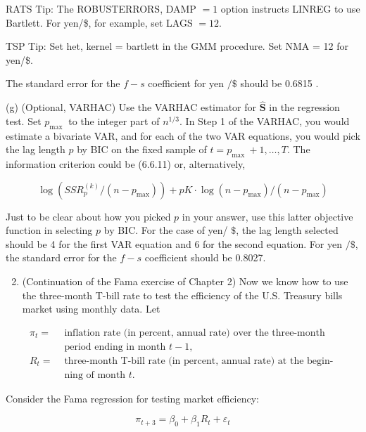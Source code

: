 \documentclass[10pt]{article}
\begin{document}
RATS Tip: The ROBUSTERRORS, DAMP $=1$ option instructs LINREG to use Bartlett. For yen/\$, for example, set LAGS $=12$.

TSP Tip: Set het, kernel = bartlett in the GMM procedure. Set NMA = 12 for yen/\$.

The standard error for the $f-s$ coefficient for yen $/ \$$ should be 0.6815 .

(g) (Optional, VARHAC) Use the VARHAC estimator for $\widehat{\mathbf{S}}$ in the regression test. Set $p_{\text {max }}$ to the integer part of $n^{1 / 3}$. In Step 1 of the VARHAC, you would estimate a bivariate VAR, and for each of the two VAR equations, you would pick the lag length $p$ by BIC on the fixed sample of $t=p_{\text {max }}+ 1, \ldots, T$. The information criterion could be (6.6.11) or, alternatively,


\begin{equation*}
\log \left(S S R_{p}^{(k)} /\left(n-p_{\max }\right)\right)+p K \cdot \log \left(n-p_{\max }\right) /\left(n-p_{\max }\right) \tag{16}
\end{equation*}


Just to be clear about how you picked $p$ in your answer, use this latter objective function in selecting $p$ by BIC. For the case of yen/ $\$$, the lag length selected should be 4 for the first VAR equation and 6 for the second equation. For yen $/ \$$, the standard error for the $f-s$ coefficient should be 0.8027.

\begin{enumerate}
  \setcounter{enumi}{1}
  \item (Continuation of the Fama exercise of Chapter 2) Now we know how to use the three-month T-bill rate to test the efficiency of the U.S. Treasury bills market using monthly data. Let
\end{enumerate}

$$
\begin{aligned}
\pi_{t}= & \text { inflation rate (in percent, annual rate) over the three-month } \\
& \text { period ending in month } t-1, \\
R_{t}= & \text { three-month } \mathrm{T} \text {-bill rate (in percent, annual rate) at the begin- } \\
& \text { ning of month } t .
\end{aligned}
$$

Consider the Fama regression for testing market efficiency:

$$
\pi_{t+3}=\beta_{0}+\beta_{1} R_{t}+\varepsilon_{t}
$$
\end{document}
